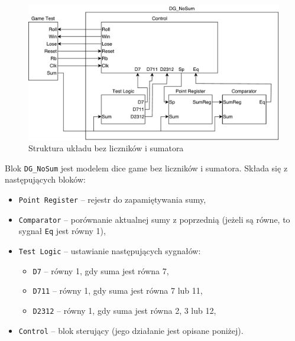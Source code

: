 \documentclass[a4paper,11pt,fleqn]{article}
\begin{document}
\begin{figure}[h]
\centering
\includegraphics[width=\textwidth]{schematics/noSum.pdf}
\caption{Struktura układu bez liczników i sumatora}
\label{noSum}
\end{figure}

Blok \texttt{DG\_NoSum} jest modelem dice game bez liczników i sumatora. Składa się z następujących bloków:
\begin{itemize}
\item \texttt{Point Register} -- rejestr do zapamiętywania sumy,
\item \texttt{Comparator} -- porównanie aktualnej sumy z poprzednią (jeżeli są równe, to sygnał \texttt{Eq} jest równy 1),
\item \texttt{Test Logic} -- ustawianie następujących sygnałów:
    \begin{itemize}
    \item \texttt{D7} -- równy 1, gdy suma jest równa 7,
    \item \texttt{D711} -- równy 1, gdy suma jest równa 7 lub 11,
    \item \texttt{D2312} -- równy 1, gdy suma jest równa 2, 3 lub 12,
    \end{itemize}
\item \texttt{Control} -- blok sterujący (jego działanie jest opisane poniżej).
\end{itemize}
\end{document}
